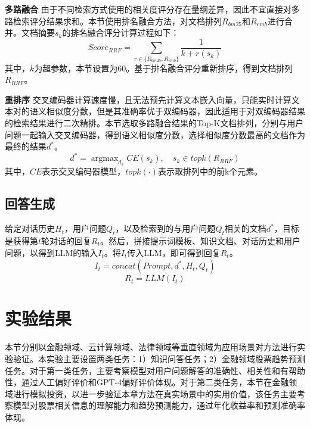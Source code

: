 \textbf{多路融合} 由于不同检索方式使用的相关度评分存在量纲差异，因此不宜直接对多路检索评分结果求和。本节使用排名融合方法，对文档排列$R_{bm25}$和$R_{emb}$进行合并。文档摘要$s_k$的排名融合评分计算过程如下：
\begin{equation}
	Score_{RRF} = \sum_{r \in \{R_{bm25},R_{emb}\}}\frac{1}{k + r(s_k)}
\end{equation}
其中，$k$为超参数，本节设置为60。基于排名融合评分重新排序，得到文档排列$R_{RRF}$。

\textbf{重排序} 交叉编码器计算速度慢，且无法预先计算文本嵌入向量，只能实时计算文本对的语义相似度分数，但是其准确率优于双编码器，因此适用于对双编码器结果的检索结果进行二次精排。本节选取多路融合结果的Top-K文档排列，分别与用户问题一起输入交叉编码器，得到语义相似度分数，选择相似度分数最高的文档作为最终的结果$d^*$。
\begin{equation}
	d^* = \mathop{\arg\max}_{d_k}CE(s_k), \quad s_k \in topk(R_{RRF})
\end{equation}
其中，$CE$表示交叉编码器模型，$topk(\cdot)$表示取排列中的前k个元素。

\subsection{回答生成}

给定对话历史$H_t$，用户问题$Q_t$，以及检索到的与用户问题$Q_t$相关的文档$d^*$，目标是获得第$t$轮对话的回复$R_t$。然后，拼接提示词模板、知识文档、对话历史和用户问题，以得到LLM的输入$I_t$。将$I_t$传入LLM，即可得到回复$R_t$。
\begin{equation}
	I_t = concat(Prompt, d^*, H_t, Q_t)
\end{equation}
\begin{equation}
	R_t = LLM(I_t)
\end{equation}

\section{实验结果}

本节分别以金融领域、云计算领域、法律领域等垂直领域为应用场景对方法进行实验验证。本实验主要设置两类任务：1）知识问答任务；2）金融领域股票趋势预测任务。对于第一类任务，主要考察模型对用户问题解答的准确性、相关性和有帮助性，通过人工偏好评价和GPT-4偏好评价体现。对于第二类任务，本节在金融领域进行模拟投资，以进一步验证本章方法在真实场景中的实用价值，该任务主要考察模型对股票相关信息的理解能力和趋势预测能力，通过年化收益率和预测准确率体现。



